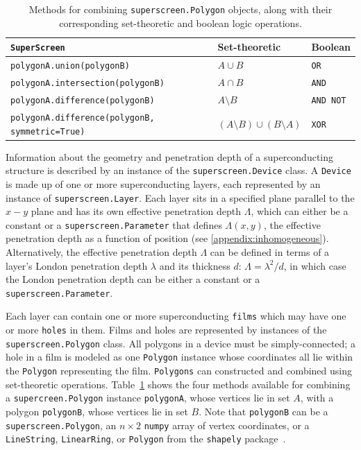 \documentclass[final,3p,times,twocolumn]{elsarticle}
\newcommand{\inline}[1]{\texttt{#1}\xspace}
\newcommand{\SuperScreen}{\inline{SuperScreen}}
\begin{document}
\begin{table}
\centering
\begin{tabular}{|l|l|l|}
\hline
\SuperScreen                             & Set-theoretic  & Boolean   \\ \hline \hline
\inline{polygonA.union(polygonB)}        & $A\cup B$      & \inline{OR}      \\
\inline{polygonA.intersection(polygonB)} & $A\cap B$      & \inline{AND}     \\
\inline{polygonA.difference(polygonB)}   & $A\setminus B$ & \inline{AND NOT} \\
\inline{polygonA.difference(polygonB, symmetric=True)} & $(A\setminus B)\cup(B\setminus A)$ & \inline{XOR} \\ \hline
\end{tabular}
\caption{Methods for combining \inline{superscreen.Polygon} objects, along with their corresponding set-theoretic and boolean logic operations.}
\label{table:polygon}
\end{table}

Information about the geometry and penetration depth of a superconducting structure is described by an instance of the \inline{superscreen.Device} class. A \inline{Device} is made up of one or more superconducting layers, each represented by an instance of  \inline{superscreen.Layer}. Each layer sits in a specified plane parallel to the $x-y$ plane and has its own effective penetration depth $\Lambda$, which can either be a constant or a \inline{superscreen.Parameter} that defines $\Lambda(x, y)$, the effective penetration depth as a function of position (see \ref{appendix:inhomogeneous}). Alternatively, the effective penetration depth $\Lambda$ can be defined in terms of a layer's London penetration depth $\lambda$ and its thickness $d$: $\Lambda=\lambda^2/d$, in which case the London penetration depth can be either a constant or a \inline{superscreen.Parameter}.

Each layer can contain one or more superconducting \inline{films} which may have one or more \inline{holes} in them. Films and holes are represented by instances of the \inline{superscreen.Polygon} class. All polygons in a device must be simply-connected; a hole in a film is modeled as one \inline{Polygon} instance whose coordinates all lie within the \inline{Polygon} representing the film. \inline{Polygons} can constructed and combined using set-theoretic operations. Table~\ref{table:polygon} shows the four methods available for combining a \inline{supercreen.Polygon} instance \inline{polygonA}, whose vertices lie in set $A$, with a polygon \inline{polygonB}, whose vertices lie in set $B$. Note that \inline{polygonB} can be a \inline{superscreen.Polygon}, an $n\times 2$ \inline{numpy} array of vertex coordinates, or a \inline{LineString}, \inline{LinearRing}, or \inline{Polygon} from the \inline{shapely} package~\cite{shapely}.
\end{document}
